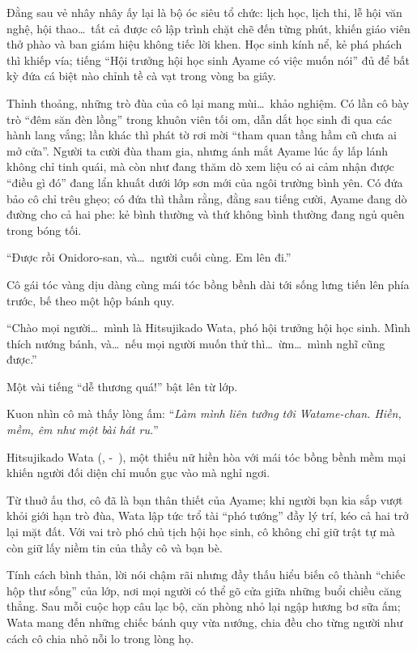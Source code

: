 \documentclass[../main.tex]{subfiles}
\begin{document}
Đằng sau vẻ nhây nhây ấy lại là bộ óc siêu tổ chức: lịch học, lịch thi, lễ hội văn nghệ, hội thao\dots\ tất cả được cô lập trình chặt chẽ đến từng phút, khiến giáo viên thở phào và ban giám hiệu không tiếc lời khen. Học sinh kính nể, kẻ phá phách thì khiếp vía; tiếng ``Hội trưởng hội học sinh Ayame có việc muốn nói'' đủ để bất kỳ đứa cá biệt nào chỉnh tề cà vạt trong vòng ba giây.

Thỉnh thoảng, những trò đùa của cô lại mang mùi\dots\ khảo nghiệm. Có lần cô bày trò ``đêm săn đèn lồng'' trong khuôn viên tối om, dẫn dắt học sinh đi qua các hành lang vắng; lần khác thì phát tờ rơi mời ``tham quan tầng hầm cũ chưa ai mở cửa''. Người ta cười đùa tham gia, nhưng ánh mắt Ayame lúc ấy lấp lánh không chỉ tinh quái, mà còn như đang thăm dò xem liệu có ai cảm nhận được ``điều gì đó'' đang lẩn khuất dưới lớp sơn mới của ngôi trường bình yên. Có đứa bảo cô chỉ trêu ghẹo; có đứa thì thầm rằng, đằng sau tiếng cười, Ayame đang dò đường cho cả hai phe: kẻ bình thường và thứ không bình thường đang ngủ quên trong bóng tối.

\chrint

``Được rồi Onidoro-san, và\dots\ người cuối cùng. Em lên đi.''

Cô gái tóc vàng dịu dàng cùng mái tóc bồng bềnh dài tới sống lưng tiến lên phía trước, bế theo một hộp bánh quy.

``Chào mọi người\dots\ mình là Hitsujikado Wata, phó hội trưởng hội học sinh. Mình thích nướng bánh, và\dots\ nếu mọi người muốn thử thì\dots\ ừm\dots\ mình nghĩ cũng được.''

Một vài tiếng ``dễ thương quá!'' bật lên từ lớp.

Kuon nhìn cô mà thấy lòng ấm:
``\textit{Làm mình liên tưởng tới Watame-chan. Hiền, mềm, êm như một bài hát ru.}''

\chrint

Hitsujikado Wata (, -\ ), một thiếu nữ hiền hòa với mái tóc bồng bềnh mềm mại khiến người đối diện chỉ muốn gục vào mà nghỉ ngơi.

Từ thuở ấu thơ, cô đã là bạn thân thiết của Ayame; khi người bạn kia sắp vượt khỏi giới hạn trò đùa, Wata lập tức trổ tài ``phó tướng'' đầy lý trí, kéo cả hai trở lại mặt đất. Với vai trò phó chủ tịch hội học sinh, cô không chỉ giữ trật tự mà còn giữ lấy niềm tin của thầy cô và bạn bè.

Tính cách bình thản, lời nói chậm rãi nhưng đầy thấu hiểu biến cô thành ``chiếc hộp thư sống'' của lớp, nơi mọi người có thể gõ cửa giữa những buổi chiều căng thẳng. Sau mỗi cuộc họp câu lạc bộ, căn phòng nhỏ lại ngập hương bơ sữa ấm; Wata mang đến những chiếc bánh quy vừa nướng, chia đều cho từng người như cách cô chia nhỏ nỗi lo trong lòng họ.
\end{document}

